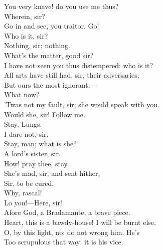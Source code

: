 \documentclass[a4paper,oneside,12pt]{memoir}
\begin{document}
\begin{drama*}
\subtlespeaks You very knave! do you use me thus?\\
\facespeaks {} Wherein, sir?\\
\subtlespeaks Go in and see, you traitor. Go!\\
\mammonspeaks {} Who is it, sir?\\
\subtlespeaks Nothing, sir; nothing.\\
\mammonspeaks {} What's the matter, good sir?\\
I have not seen you thus distempered: who is it?\\
\subtlespeaks All arts have still had, sir, their adversaries;\\
But ours the most ignorant.---\\
 What now?\\
\facespeaks 'Twas not my fault, sir; she would speak with you.\\
\subtlespeaks Would she, sir! Follow me.\\
\mammonspeaks {} Stay, Lungs.\\
\facespeaks {} I dare not, sir.\\
\mammonspeaks Stay, man; what is she?\\
\facespeaks {} A lord's sister, sir.\\
\mammonspeaks How! pray thee, stay.\\
\facespeaks {} She's mad, sir, and sent hither,\\
\facespeaks Sir, to be cured.\\
\subtlespeaks {}  Why, rascal!\\
\facespeaks {} Lo you!---Here, sir!\\
\mammonspeaks Afore God, a Bradamante, a brave piece.\\
\surlyspeaks Heart, this is a bawdy-house! I will be burnt else.\\
\mammonspeaks O, by this light, no: do not wrong him. He's\\
Too scrupulous that way: it is his vice.\\

\end{drama*}
\end{document}
